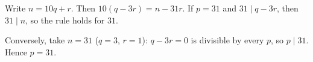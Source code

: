 Write $n=10q+r$. Then $10(q-3r)=n-31r$. If $p=31$ and $31\mid q-3r$, then $31\mid n$, so the rule holds for $31$.

Conversely, take $n=31$ ($q=3$, $r=1$): $q-3r=0$ is divisible by every $p$, so $p\mid31$. Hence $p=\boxed{31}$.
